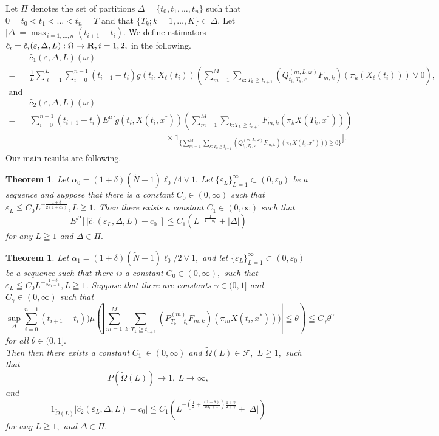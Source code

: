 \documentclass[12pt]{article}
\newtheorem{theorem}[thm]{Theorem}
\begin{document}
Let $\Pi$ denotes the set of partitions $\Delta=\{t_0,t_1,\ldots, t_n\}$ such that 
$0=t_0 < t_1 < \ldots < t_n= T$ and that   
$\{T_k; k=1,\ldots,K\} \subset \Delta.$
Let $|\Delta|=\max_{i=1,\ldots,n}{(t_{i+1}-t_i)}.$
We define estimators $\hat{c}_i=\hat{c}_i(\varepsilon,\Delta, L) : \Omega \to {\bf R}, i=1,2,$ in the following.
\begin{align}
&\hat{c}_1(\varepsilon, \Delta, L)(\omega) \nonumber\\
=&\frac{1}{L} \sum_{\ell=1}^L \sum_{i=0}^{n-1} (t_{i+1}-t_i) g(t_i,X_{\ell}(t_i))
(\sum_{m=1}^M \sum_{k:T_k\geqq t_{i+1}} (Q_{t_i,T_k,\varepsilon}^{(m,L,\omega)}F_{m,k})(\pi_k(X_{\ell}(t_i)))\vee0), \label{app1}\\
\text{and}\nonumber \\
&\hat{c}_2(\varepsilon, \Delta, L)(\omega)\nonumber\\
=&\sum_{i=0}^{n-1}(t_{i+1}-t_{i}) E^{\mu}[g(t_i,X(t_i, x^*)) ( \sum_{m=1}^M \sum_{k:T_k\geqq t_{i+1}} F_{m,k}(\pi_k X(T_k, x^*))) \nonumber \\
& \qquad \qquad \qquad \qquad \qquad \qquad \qquad \qquad \times 1_{\{\sum_{m=1}^M \sum_{k:T_k\geqq t_{i+1}} (Q_{t_i,T_k,\varepsilon}^{(m,L,\omega)}F_{m,k})(\pi_k X(t_i,x^*))) \geqq 0\}}]. \label{app2}
\end{align}
Our main results are following.
\begin{theorem} \label{main2}
Let $\alpha_0 = (1+\delta)(\tilde{N}+1)\ell_0/4 \vee 1.$ Let $\{\varepsilon_L\}_{L = 1}^{\infty} \subset (0, \varepsilon_0)$ be a sequence and suppose
 that there is a constant $C_0 \in (0, \infty)$ such that $ \varepsilon_L \leqq C_0 L^{-\frac{1+ \delta}{2(1+\alpha_0)}}, L\geqq 1.$
 Then there exists a constant $C_1 \in (0,\infty)$ such that
$$
E^P[|\hat{c}_1(\varepsilon_L, \Delta, L)-c_{0}|] \leqq C_1 (L^{-\frac{1}{1+\alpha_0}}+|\Delta|)
$$
for any $L \geqq 1$ and $\Delta \in \Pi.$
\end{theorem}

\begin{theorem}\label{main1} 
Let $\alpha_1 = (1+\delta)(\tilde{N}+1)\ell_0/2 \vee 1,$ and
let $\{\varepsilon_L\}_{L = 1}^{\infty} \subset (0, \varepsilon_0)$ be a sequence such that there is a constant $C_0 \in (0,\infty),$ 
such that $\varepsilon_L \leqq C_0 L^{-\frac{1+ \delta}{2\alpha_1+1}}, L \geqq 1.$ 
Suppose that there are constants $ \gamma \in (0,1]$  and $C_{\gamma} \in (0, \infty)$ such that
 $$\sup_{\Delta} \sum_{i=0}^{n-1} (t_{i+1}-t_i)){\mu} (| \sum_{m=1}^M\sum_{k:T_k\geqq t_{i+1}} (P_{T_k-t_i}^{(m)}F_{m,k})(\pi_m X(t_i,x^*)))| \leqq \theta ) \leqq C_{\gamma}\theta^{\gamma}$$
for all $ \theta \in (0,1].$\\
Then then there exists a constant $C_1\ \in (0,\infty)$ and $\tilde{\Omega}(L) \in \mathcal{F},$  $L\geqq 1 ,$ such that
$$P(\tilde{\Omega}(L)) \to 1, \ L\to \infty,$$
and
$$
1_{\tilde{\Omega}(L)}|\hat{c}_2(\varepsilon_L, \Delta, L)-c_{0}|
\leqq  C_1
(L^{-(\frac{1}{2}+ \frac{(1-\delta)}{2 \alpha_1 +1}) \frac{1+\gamma}{2+\gamma}}+|\Delta|)
$$
for any $L\geqq 1,$ and $\Delta \in \Pi.$
\end{theorem}
\end{document}
